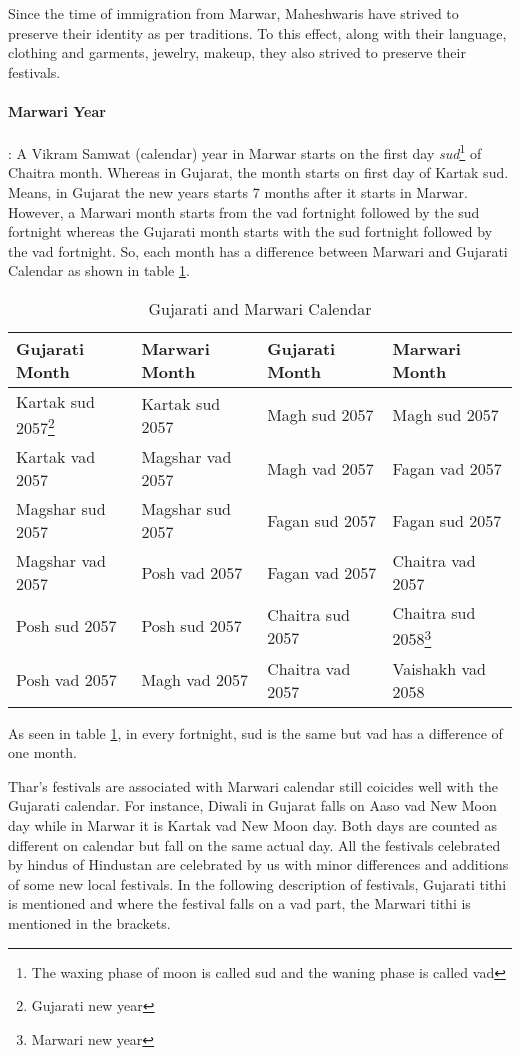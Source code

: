 Since the time of immigration from Marwar, Maheshwaris have strived to preserve
their identity as per traditions. To this effect, along with their language,
clothing and garments, jewelry, makeup, they also strived to preserve their
festivals.
\paragraph{Marwari Year}: A Vikram Samwat (calendar) year in Marwar starts on
the first day \textit{sud}\footnote{The waxing phase of moon is called sud and
the waning phase is called vad} of Chaitra month. Whereas in Gujarat, the month
starts on first day of Kartak sud. Means, in Gujarat the new years starts 7
months after it starts in Marwar. However, a Marwari month starts from the vad
fortnight followed by the sud fortnight whereas the Gujarati month starts with
the sud fortnight followed by the vad fortnight.
So, each month has a difference between Marwari and Gujarati Calendar as shown
in table \ref{tbl:cal}.

\begin{table}
\begin{center}
\begin{tabular}{l|l|l|l}
\hline
\textbf{Gujarati Month} & \textbf{Marwari Month} & \textbf{Gujarati Month} &
\textbf{Marwari Month}\\ 
\hline
Kartak sud 2057\footnote{Gujarati new year} & Kartak sud 2057 & Magh sud 2057 & Magh sud 2057 \\
Kartak vad 2057 & Magshar vad 2057 & Magh vad 2057 & Fagan vad 2057 \\
Magshar sud 2057 & Magshar sud 2057 & Fagan sud 2057 & Fagan sud 2057 \\
Magshar vad 2057 & Posh vad 2057 & Fagan vad 2057 & Chaitra vad 2057 \\
Posh sud 2057 & Posh sud 2057 &Chaitra sud 2057 &Chaitra sud
2058\footnote{Marwari new year} \\
Posh vad 2057 & Magh vad 2057 & Chaitra vad 2057 & Vaishakh vad 2058 \\
\hline
\end{tabular}
\end{center}
\label{tbl:cal}
\caption{Gujarati and Marwari Calendar}
\end{table}
As seen in table \ref{tbl:cal}, in every fortnight, sud is the same but vad has
a difference of one month.

Thar's festivals are associated with Marwari calendar still coicides well with
the Gujarati calendar. For instance, Diwali in Gujarat falls on Aaso vad New
Moon day while in Marwar it is Kartak vad New Moon day. Both days are counted as
different on calendar but fall on the same actual day. All the festivals
celebrated by hindus of Hindustan are celebrated by us with minor differences
and additions of some new local festivals.
In the following description of festivals, Gujarati tithi is mentioned and where
the festival falls on a vad part, the Marwari tithi is mentioned in the
brackets.
